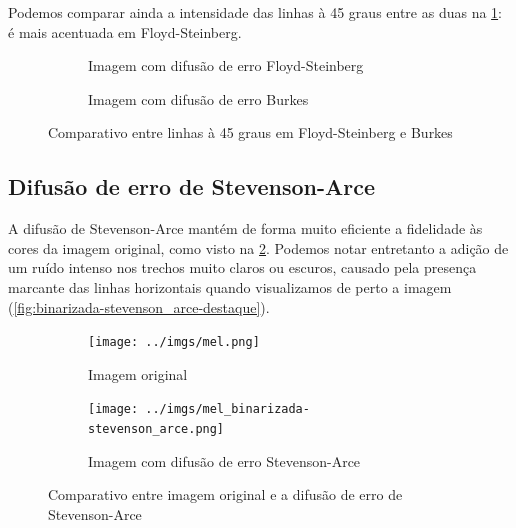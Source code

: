 \documentclass[brazilian,a4paper,twocolumn]{article}
\begin{document}
        Podemos comparar ainda a intensidade das linhas à 45 graus entre as duas na \cref{fig:binarizada-floyd_steinberg-burkes-linhas}: é mais acentuada em Floyd-Steinberg.

        \begin{figure}
            \centering
            \begin{subfigure}{0.24\textwidth}
                \caption{Imagem com difusão de erro Floyd-Steinberg}
            \end{subfigure}
            \begin{subfigure}{0.24\textwidth}
                \caption{Imagem com difusão de erro Burkes}
            \end{subfigure}

            \caption{Comparativo entre linhas à 45 graus em Floyd-Steinberg e Burkes}
            \label{fig:binarizada-floyd_steinberg-burkes-linhas}
        \end{figure}

    \subsection{Difusão de erro de Stevenson-Arce}

        A difusão de Stevenson-Arce mantém de forma muito eficiente a fidelidade às cores da imagem original, como visto na \cref{fig:binarizada-stevenson_arce}. Podemos notar entretanto a adição de um ruído intenso nos trechos muito claros ou escuros, causado pela presença marcante das linhas horizontais quando visualizamos de perto a imagem (\cref{fig:binarizada-stevenson_arce-destaque}).

        \begin{figure}
            \centering
            \begin{subfigure}{0.24\textwidth}
                \texttt{[image: ../imgs/mel.png]}
                \caption{Imagem original}
            \end{subfigure}
            \begin{subfigure}{0.24\textwidth}
                \texttt{[image: ../imgs/mel\_binarizada-stevenson\_arce.png]}
                \caption{Imagem com difusão de erro Stevenson-Arce}
            \end{subfigure}

            \caption{Comparativo entre imagem original e a difusão de erro de Stevenson-Arce}
            \label{fig:binarizada-stevenson_arce}
        \end{figure}
\end{document}
